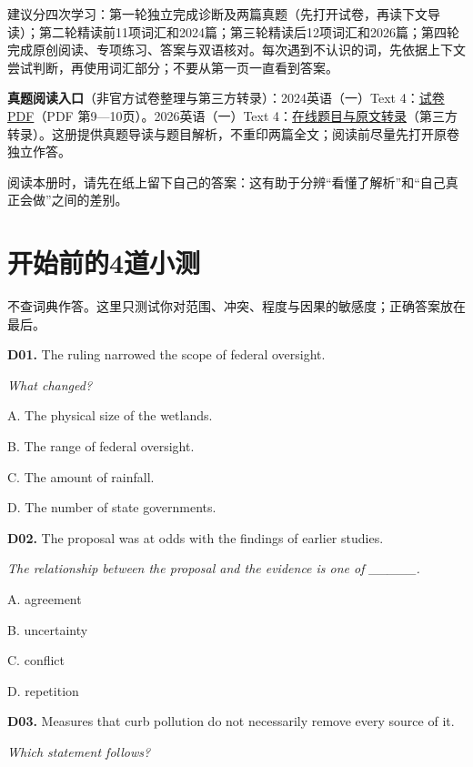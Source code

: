 \documentclass[a4paper,11pt,openany]{report}
\renewenvironment{quote}{%
 \par\begin{list}{}{\setlength{\leftmargin}{1.25em}\setlength{\rightmargin}{0em}}\item[]\color{bodygrey}\ignorespaces
}{\end{list}}
\begin{document}
建议分四次学习：第一轮独立完成诊断及两篇真题（先打开试卷，再读下文导读）；第二轮精读前11项词汇和2024篇；第三轮精读后12项词汇和2026篇；第四轮完成原创阅读、专项练习、答案与双语核对。每次遇到不认识的词，先依据上下文尝试判断，再使用词汇部分；不要从第一页一直看到答案。

\textbf{真题阅读入口}（非官方试卷整理与第三方转录）：2024英语（一）Text 4：\href{https://ac-wiki.org/general-skills/study/assets/2024-201.pdf}{试卷 PDF}（PDF 第9---10页）。2026英语（一）Text 4：\href{https://english-exam.lazynote.cn/kaoyan/sections/2026-english-one/section2-part-a-4/}{在线题目与原文转录}（第三方转录）。这册提供真题导读与题目解析，不重印两篇全文；阅读前尽量先打开原卷独立作答。

\begin{quote}
阅读本册时，请先在纸上留下自己的答案：这有助于分辨``看懂了解析''和``自己真正会做''之间的差别。
\end{quote}

\clearpage
\section{开始前的4道小测}\label{ux5f00ux59cbux524dux76844ux9053ux5c0fux6d4b}

不查词典作答。这里只测试你对范围、冲突、程度与因果的敏感度；正确答案放在最后。

\textbf{D01.} The ruling narrowed the scope of federal oversight.

\emph{What changed?}

A. The physical size of the wetlands.

B. The range of federal oversight.

C. The amount of rainfall.

D. The number of state governments.

\textbf{D02.} The proposal was at odds with the findings of earlier studies.

\emph{The relationship between the proposal and the evidence is one of \_\_\_\_\_.}

A. agreement

B. uncertainty

C. conflict

D. repetition

\textbf{D03.} Measures that curb pollution do not necessarily remove every source of it.

\emph{Which statement follows?}
\end{document}
